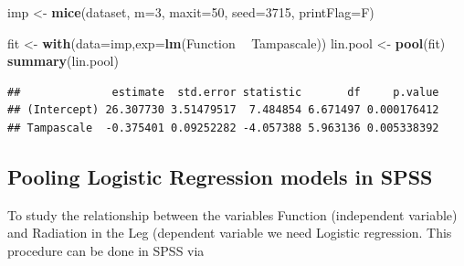 \documentclass[]{book}
\newenvironment{Shaded}{\begin{snugshade}}{\end{snugshade}}
\newcommand{\KeywordTok}[1]{\textcolor[rgb]{0.13,0.29,0.53}{\textbf{#1}}}
\newcommand{\DataTypeTok}[1]{\textcolor[rgb]{0.13,0.29,0.53}{#1}}
\newcommand{\DecValTok}[1]{\textcolor[rgb]{0.00,0.00,0.81}{#1}}
\newcommand{\StringTok}[1]{\textcolor[rgb]{0.31,0.60,0.02}{#1}}
\newcommand{\CommentTok}[1]{\textcolor[rgb]{0.56,0.35,0.01}{\textit{#1}}}
\newcommand{\OperatorTok}[1]{\textcolor[rgb]{0.81,0.36,0.00}{\textbf{#1}}}
\newcommand{\NormalTok}[1]{#1}
\begin{document}
\begin{Shaded}
\begin{Highlighting}[]
\NormalTok{imp <-}\StringTok{ }\KeywordTok{mice}\NormalTok{(dataset, }\DataTypeTok{m=}\DecValTok{3}\NormalTok{, }\DataTypeTok{maxit=}\DecValTok{50}\NormalTok{, }\DataTypeTok{seed=}\DecValTok{3715}\NormalTok{, }\DataTypeTok{printFlag=}\NormalTok{F)}

\NormalTok{fit <-}\StringTok{ }\KeywordTok{with}\NormalTok{(}\DataTypeTok{data=}\NormalTok{imp,}\DataTypeTok{exp=}\KeywordTok{lm}\NormalTok{(Function }\OperatorTok{~}\StringTok{ }\NormalTok{Tampascale))}
\NormalTok{lin.pool <-}\StringTok{ }\KeywordTok{pool}\NormalTok{(fit)}
\KeywordTok{summary}\NormalTok{(lin.pool)}
\end{Highlighting}
\end{Shaded}

\begin{verbatim}
##              estimate  std.error statistic       df     p.value
## (Intercept) 26.307730 3.51479517  7.484854 6.671497 0.000176412
## Tampascale  -0.375401 0.09252282 -4.057388 5.963136 0.005338392
\end{verbatim}

\begin{Shaded}
\end{Shaded}

\subsection{Pooling Logistic Regression models in
SPSS}\label{pooling-logistic-regression-models-in-spss}

To study the relationship between the variables Function (independent
variable) and Radiation in the Leg (dependent variable we need Logistic
regression. This procedure can be done in SPSS via
\end{document}

